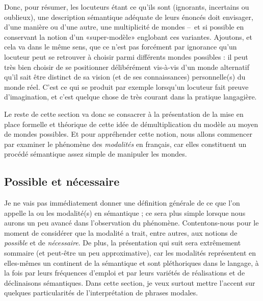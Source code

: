 Donc, pour résumer, les locuteurs étant ce qu'ils sont (ignorants,
incertains ou oublieux), une description sémantique adéquate de leurs
énoncés doit envisager, d'une manière ou d'une autre, une multiplicité
de mondes --~et si possible en conservant la notion d'un
«super-modèle» englobant ces variantes.  Ajoutons, et cela va dans
le même sens, que ce n'est pas forcément par ignorance qu'un locuteur
peut se retrouver à choisir parmi différents mondes possibles : il peut très
bien choisir de se positionner délibérément vis-à-vis d'un monde 
alternatif qu'il sait être distinct de sa vision (et de ses
connaissances) personnelle(s) du monde réel.  C'est ce qui se produit
par exemple lorsqu'un locuteur fait preuve d'imagination, et c'est
quelque chose de très courant dans la pratique langagière.  

\largerpage

Le reste de cette section va donc se consacrer à la présentation de la
mise en place formelle et théorique de cette idée de démultiplication du
modèle au moyen de mondes possibles.  Et pour appréhender cette
notion, nous allons commencer par 
examiner le phénomène des \emph{modalités} en français, car elles
constituent un procédé sémantique assez simple de manipuler les mondes.



\subsection{Possible et nécessaire}
\label{ss:possnec}

Je ne vais pas immédiatement donner une définition générale de ce que l'on appelle la ou les modalité(s) en sémantique ; ce sera plus simple lorsque nous aurons un peu avancé dans l'observation du phénomène. 
Contentons-nous pour le moment de considérer que la modalité a trait, entre autres, aux notions de  \emph{possible} et de \emph{nécessaire}.
De plus, la présentation qui suit sera extrêmement sommaire (et peut-être un peu approximative), car les modalités représentent en elles-mêmes un continent de la sémantique et sont
pléthoriques dans le langage, à la fois par leurs fréquences d'emploi
et par leurs variétés de réalisations et de déclinaisons sémantiques.
Dans cette section, je veux surtout mettre l'accent sur quelques particularités de l'interprétation de phrases modales. 

